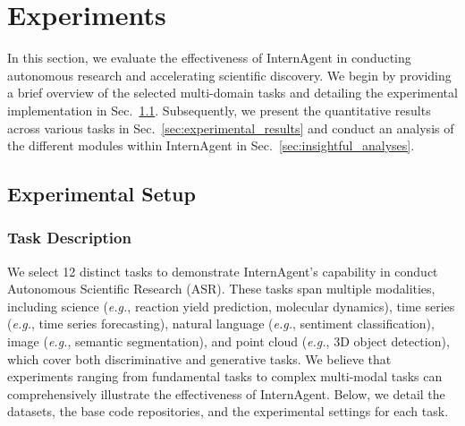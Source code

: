 \section{Experiments}
\label{sec:exp}

In this section, we evaluate the effectiveness of InternAgent in conducting autonomous research and accelerating scientific discovery. We begin by providing a brief overview of the selected multi-domain tasks and detailing the experimental implementation in Sec.~\ref{sec:experimental_setup}. Subsequently, we present the quantitative results across various tasks in Sec.~\ref{sec:experimental_results} and conduct an analysis of the different modules within InternAgent in Sec.~\ref{sec:insightful_analyses}.

\subsection{Experimental Setup}
\label{sec:experimental_setup}

\subsubsection{Task Description}

We select 12 distinct tasks to demonstrate InternAgent's capability in conduct Autonomous Scientific Research (ASR). These tasks span multiple modalities, including science (\textit{e.g.}, reaction yield prediction, molecular dynamics), time series (\textit{e.g.}, time series forecasting), natural language (\textit{e.g.}, sentiment classification), image (\textit{e.g.}, semantic segmentation), and point cloud (\textit{e.g.}, 3D object detection), which cover both discriminative and generative tasks. We believe that experiments ranging from fundamental tasks to complex multi-modal tasks can comprehensively illustrate the effectiveness of InternAgent. Below, we detail the datasets, the base code repositories, and the experimental settings for each task.


